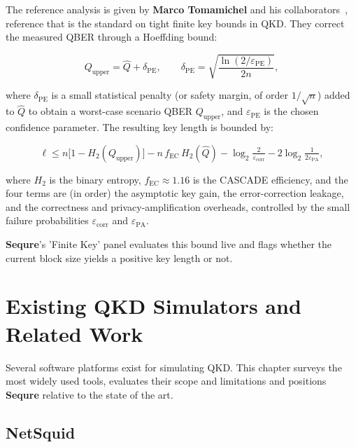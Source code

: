 \documentclass[12pt, a4paper]{article}
\begin{document}
The reference analysis is given by \textbf{Marco Tomamichel} and his collaborators~\cite{tomamichel2012}, reference that is the standard on tight finite key bounds in QKD. They correct the measured QBER through a Hoeffding bound:

\begin{equation*}
  Q_\mathrm{upper} = \hat{Q} + \delta_\mathrm{PE}, \qquad
  \delta_\mathrm{PE} = \sqrt{\frac{\ln(2/\varepsilon_\mathrm{PE})}{2n}},
  \label{eq:hoeffding}
\end{equation*}

where $\delta_\mathrm{PE}$ is a small statistical penalty (or safety margin, of order
$1/\sqrt{n}$) added to $\hat{Q}$ to obtain a worst-case scenario QBER
$Q_\mathrm{upper}$, and $\varepsilon_\mathrm{PE}$ is the chosen
confidence parameter. The resulting key length is bounded by:

\begin{equation*}
  \ell \leq n\bigl[1 - H_2(Q_\mathrm{upper})\bigr]
           - n\,f_\mathrm{EC}\,H_2(\hat{Q})
           - \log_2\!\tfrac{2}{\varepsilon_\mathrm{corr}}
           - 2\log_2\!\tfrac{1}{2\varepsilon_\mathrm{PA}},
  \label{eq:finite-key}
\end{equation*}

where $H_2$ is the binary entropy, $f_\mathrm{EC} \approx 1.16$ is
the CASCADE efficiency, and the four terms are (in order) the
asymptotic key gain, the error-correction leakage, and the
correctness and privacy-amplification overheads, controlled by the
small failure probabilities $\varepsilon_\mathrm{corr}$ and
$\varepsilon_\mathrm{PA}$.

\textbf{Sequre}'s 'Finite Key' panel evaluates this bound live and flags
whether the current block size yields a positive key length or not.

\newpage
\section{Existing QKD Simulators and Related Work}
\label{sec:related-work}

Several software platforms exist for simulating QKD. This chapter surveys the most widely used tools, evaluates their scope and limitations and positions \textbf{Sequre} relative to the state of the art.


\subsection{NetSquid}
\label{sec:netsquid}
\end{document}
